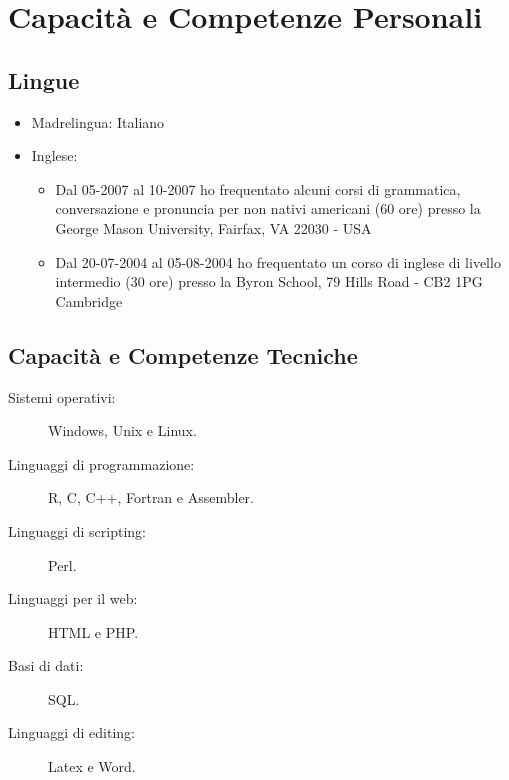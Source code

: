 \documentclass[a4paper,10pt]{article}
\begin{document}




\section*{Capacit\`a e Competenze Personali}

\subsection*{Lingue}
\begin{itemize}
\item Madrelingua: Italiano
\item Inglese:
  \begin{itemize}
    \item Dal 05-2007 al 10-2007 ho frequentato alcuni corsi di grammatica, conversazione e pronuncia per non nativi americani (60 ore)
      presso la George Mason University, Fairfax, VA 22030 - USA
    \item Dal 20-07-2004 al 05-08-2004 ho frequentato un corso di inglese di livello intermedio (30 ore)
      presso la Byron School, 79 Hills Road - CB2 1PG Cambridge 
  \end{itemize}
\end{itemize}

\subsection*{Capacit\`a e Competenze Tecniche}
\begin{description}
\item[Sistemi operativi:] Windows, Unix e Linux.
\item[Linguaggi di programmazione:] R, C, C++, Fortran e Assembler.
\item[Linguaggi di scripting:]  Perl.
\item[Linguaggi per il web:] HTML e PHP.
\item[Basi di dati:] SQL.
\item[Linguaggi di editing:] Latex e Word.
\end{description}
\end{document}
